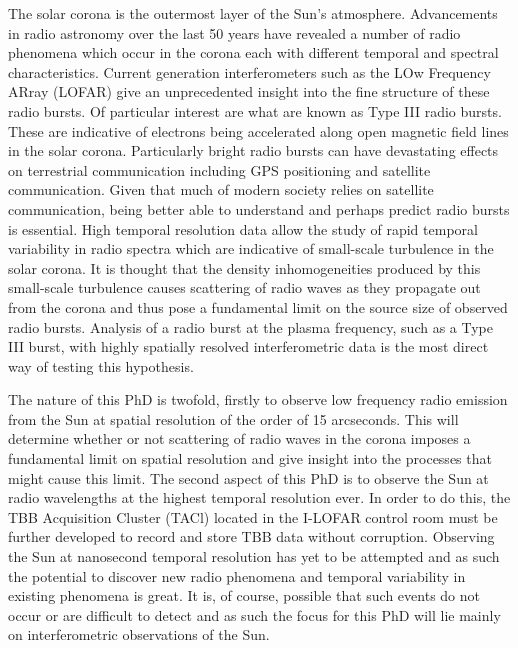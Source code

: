 \begin{abstracts} 
The solar corona is the outermost layer of the Sun's atmosphere. Advancements in radio astronomy over the last 50 years have revealed a number of radio phenomena which occur in the corona each with different temporal and spectral characteristics. Current generation interferometers such as the LOw Frequency ARray (LOFAR) give an unprecedented insight into the fine structure of these radio bursts. Of particular interest are what are known as Type III radio bursts. These are indicative of electrons being accelerated along open magnetic field lines in the solar corona. Particularly bright radio bursts can have devastating effects on terrestrial communication including GPS positioning and satellite communication. Given that much of modern society relies on satellite communication, being better able to understand and perhaps predict radio bursts is essential. High temporal resolution data allow the study of rapid temporal variability in radio spectra which are indicative of small-scale turbulence in the solar corona. It is thought that the density inhomogeneities produced by this small-scale turbulence causes scattering of radio waves as they propagate out from the corona and thus pose a fundamental limit on the source size of observed radio bursts. Analysis of a radio burst at the plasma frequency, such as a Type III burst, with highly spatially resolved interferometric data is the most direct way of testing this hypothesis.%

The nature of this PhD is twofold, firstly to observe low frequency radio emission from the Sun at spatial resolution of the order of 15 arcseconds. This will determine whether or not scattering of radio waves in the corona imposes a fundamental limit on spatial resolution and give insight into the processes that might cause this limit. The second aspect of this PhD is to observe the Sun at radio wavelengths at the highest temporal resolution ever. In order to do this, the TBB Acquisition Cluster (TACl) located in the I-LOFAR control room must be further developed to record and store TBB data without corruption. Observing the Sun at nanosecond temporal resolution has yet to be attempted and as such the potential to discover new radio phenomena and temporal variability in existing phenomena is great. It is, of course, possible that such events do not occur or are difficult to detect and as such the focus for this PhD will lie mainly on interferometric observations of the Sun.


\end{abstracts}
